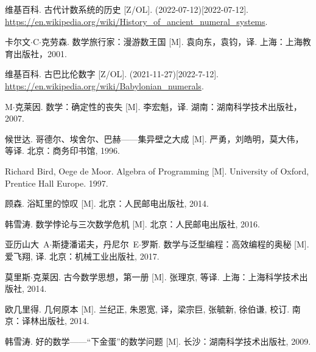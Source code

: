 \documentclass[UTF8]{article}
\begin{document}
\fi


\begin{thebibliography}{99}


维基百科. 古代计数系统的历史 [Z/OL]. (2022-07-12)[2022-07-12]. \url{https://en.wikipedia.org/wiki/History_of_ancient_numeral_systems}.

卡尔文$\cdot$C$\cdot$克劳森. 数学旅行家：漫游数王国 [M]. 袁向东，袁钧，译. 上海：上海教育出版社，2001. %

维基百科. 古巴比伦数字 [Z/OL]. (2021-11-27)[2022-7-12]. \url{https://en.wikipedia.org/wiki/Babylonian_numerals}.

M$\cdot$克莱因. 数学：确定性的丧失 [M]. 李宏魁，译. 湖南：湖南科学技术出版社，2007. %

候世达. 哥德尔、埃舍尔、巴赫——集异壁之大成 [M]. 严勇，刘皓明，莫大伟，等译. 北京：商务印书馆, 1996. %

Richard Bird, Oege de Moor. Algebra of Programming [M]. University of Oxford, Prentice Hall Europe. 1997. %

顾森. 浴缸里的惊叹 [M]. 北京：人民邮电出版社, 2014. %


韩雪涛. 数学悖论与三次数学危机 [M]. 北京：人民邮电出版社, 2016. %

亚历山大\ A$\cdot$斯捷潘诺夫，丹尼尔\ E$\cdot$罗斯. 数学与泛型编程：高效编程的奥秘 [M]. 爱飞翔, 译. 北京：机械工业出版社, 2017. %

莫里斯$\cdot$克莱因. 古今数学思想，第一册 [M]. 张理京, 等译. 上海：上海科学技术出版社, 2014. %

欧几里得. 几何原本 [M]. 兰纪正, 朱恩宽, 译，梁宗巨, 张毓新, 徐伯谦, 校订. 南京：译林出版社, 2014. %

韩雪涛. 好的数学——“下金蛋”的数学问题 [M]. 长沙：湖南科学技术出版社, 2009. %


\end{thebibliography}
\end{document}
